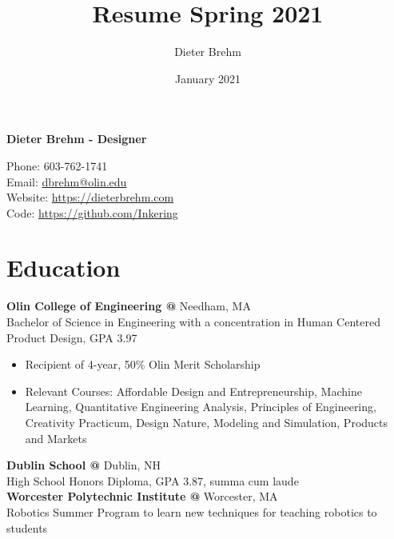 \documentclass[10pt]{article} %
\title{Resume Spring 2021}
\author{Dieter Brehm}
\date{January 2021}
\begin{document}
{\LARGE\bfseries Dieter Brehm - Designer} %

Phone: 603-762-1741\\ %
Email: \href{mailto:dbrehm@olin.edu}{dbrehm@olin.edu}\\ %
Website: \href{https://dieterbrehm.com}{https://dieterbrehm.com}\\ %
Code: \href{https://github.com/Inkering}{https://github.com/Inkering}\\ %

\begin{minipage}[t]{0.8\textwidth}
\section*{Education}
\textbf{Olin College of Engineering @} \space Needham, MA\\
Bachelor of Science in Engineering with a concentration in Human Centered Product Design, GPA 3.97\\
\begin{itemize} [noitemsep,topsep=0pt]
  \item Recipient of 4-year, 50\% Olin Merit Scholarship
  \item Relevant Courses: Affordable Design and Entrepreneurship, Machine Learning, Quantitative Engineering Analysis, Principles of Engineering, Creativity Practicum, Design Nature, Modeling and Simulation, Products and Markets
  \\
\end{itemize}
\textbf{Dublin School @} \space Dublin, NH\\
High School Honors Diploma, GPA 3.87, summa cum laude\\
\textbf{Worcester Polytechnic Institute @} \space Worcester, MA\\
Robotics Summer Program to learn new techniques for teaching robotics to students


\end{minipage}
\end{document}
